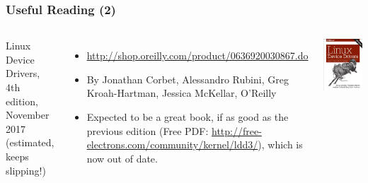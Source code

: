 \begin{frame}
  \frametitle{Useful Reading (2)}
  \begin{columns}
    Linux Device Drivers, 4th edition, November 2017 (estimated, keeps
    slipping!)
    \begin{itemize}
    \item \url{http://shop.oreilly.com/product/0636920030867.do}
    \item By Jonathan Corbet, Alessandro Rubini, Greg Kroah-Hartman,
      Jessica McKellar, O'Reilly
    \item Expected to be a great book, if as good as the previous
      edition (Free PDF: \url{http://free-electrons.com/community/kernel/ldd3/}),
      which is now out of date.
    \end{itemize}
    \includegraphics[width=\textwidth]{slides/kernel-resources-references/linux-device-drivers4.jpg}
  \end{columns}
\end{frame}

